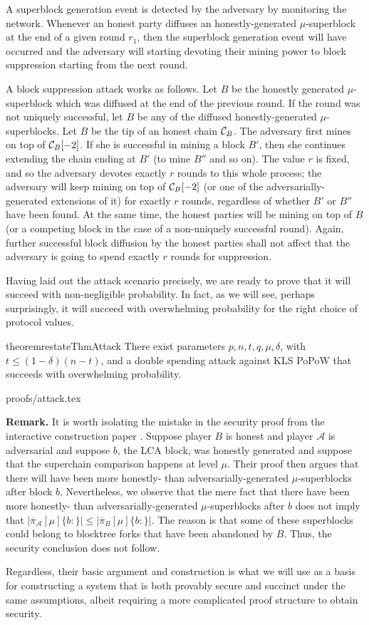 A superblock generation event is detected by the adversary by monitoring the
network. Whenever an honest party diffuses an honestly-generated
$\mu$-superblock at the end of a given round $r_1$, then the superblock
generation event will have occurred and the adversary will starting devoting
their mining power to block suppression starting from the next round.

A block suppression attack works as follows. Let $B$ be the honestly generated
$\mu$-superblock which was diffused at the end of the previous round. If the
round was not uniquely successful, let $B$ be any of the diffused
honestly-generated $\mu$-superblocks. Let $B$ be the tip of an honest chain
$\mathcal{C}_B$. The adversary first mines on top of $\mathcal{C}_B[-2]$. If she is
successful in mining a block $B'$, then she continues extending the chain ending
at $B'$ (to mine $B''$ and so on). The value $r$ is fixed, and so the adversary
devotes exactly $r$ rounds to this whole process; the adversary will keep mining
on top of $\mathcal{C}_B[-2]$ (or one of the adversarially-generated extensions of
it) for exactly $r$ rounds, regardless of whether $B'$ or $B''$ have been found.
At the same time, the honest parties will be mining on top of $B$ (or a
competing block in the case of a non-uniquely successful round). Again, further
successful block diffusion by the honest parties shall not affect that the
adversary is going to spend exactly $r$ rounds for suppression.

Having laid out the attack scenario precisely, we are ready to prove that it
will succeed with non-negligible probability. In fact, as we will see, perhaps
surprisingly, it will succeed with overwhelming probability for the right choice
of protocol values.

\begin{restatable}{theorem}{restateThmAttack}
There exist parameters $p, n, t, q,  \mu, \delta$, with $t\leq (1-\delta)(n-t)$,
and a double spending attack against KLS PoPoW that succeeds with overwhelming
probability.
\end{restatable}
\ifonecolumn
{proofs/attack.tex}
\fi

\textbf{Remark.} It is worth isolating the mistake in the security proof from
the interactive construction paper \cite{KLS}. Suppose player $B$ is honest and
player $\mathcal{A}$ is adversarial and suppose $b$, the LCA block, was honestly
generated and suppose that the superchain comparison happens at level $\mu$.
Their proof then argues that there will have been more honestly- than
adversarially-generated $\mu$-superblocks after block $b$. Nevertheless, we
observe that the mere fact that there have been more honestly- than
adversarially-generated $\mu$-superblocks after $b$ does not imply that
$|\overline\pi_\mathcal{A}[\mu]\{b:\}| \leq |\overline\pi_B[\mu]\{b:\}|$. The
reason is that some of these superblocks could belong to blocktree forks that
have been abandoned by $B$. Thus, the security conclusion does not follow.

Regardless, their basic argument and construction is what we will use as a basis
for constructing a system that is both provably secure and succinct under the
same assumptions, albeit requiring a more complicated proof structure to obtain
security.
